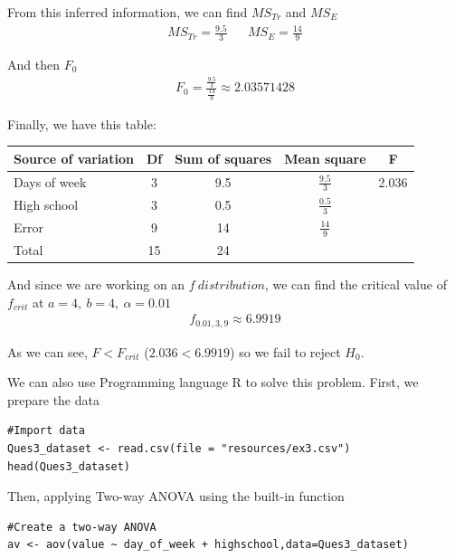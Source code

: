 \documentclass[a4paper]{article}
\numberwithin{equation}{section}
\begin{document}
From this inferred information, we can find \(MS_{Tr}\) and \(MS_{E}\)
\begin{align*}
  MS_{Tr} = \frac{9.5}{3} &  & MS_{E} = \frac{14}{9}
\end{align*}

And then \(F_0\)
\begin{align*}
  F_0 = \frac{\frac{9.5}{3}}{\frac{14}{9}} \approx 2.03571428
\end{align*}

Finally, we have this table:

\begin{center}
  \begin{tabular}{lcccc}
    \toprule
    Source of variation & Df & Sum of squares & Mean square       & F     \\
    \midrule
    Days of week        & 3  & 9.5            & \(\frac{9.5}{3}\) & 2.036 \\
    High school         & 3  & 0.5            & \(\frac{0.5}{3}\)         \\
    Error               & 9  & 14             & \(\frac{14}{9}\)          \\
    Total               & 15 & 24                                         \\
    \bottomrule
  \end{tabular}
\end{center}

And since we are working on an \(f\ distribution\), we can find the critical value of \(f_{crit}\) at \(a = 4,\ b = 4,\ \alpha = 0.01\)
\begin{align*}
  f_{0.01,3,9} \approx 6.9919
\end{align*}

As we can see, \(F < F_{crit}\) (\(2.036 < 6.9919\)) so we fail to reject \(H_0\).

\newpage
We can also use Programming language R to solve this problem.
First, we prepare the data
\begin{mdframed}[leftline=false,rightline=false,backgroundcolor=magenta!10,nobreak=true]
  \begin{verbatim}
#Import data
Ques3_dataset <- read.csv(file = "resources/ex3.csv")
head(Ques3_dataset)
  \end{verbatim}
\end{mdframed}

Then, applying Two-way ANOVA using the built-in function

\begin{mdframed}[leftline=false,rightline=false,backgroundcolor=magenta!10,nobreak=true]
  \begin{verbatim}
#Create a two-way ANOVA
av <- aov(value ~ day_of_week + highschool,data=Ques3_dataset)
  \end{verbatim}
\end{mdframed}
\end{document}
